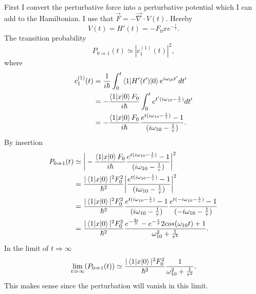 \begin{example}
\begin{enumerate}
		First I convert the perturbative force into a perturbative potential which I can add to the Hamiltonian. I use that $\vec{F}=-\vec{\nabla}\cdot V(t)$. Hereby
		\begin{equation}
			V(t)=H'(t)=-F_0xe^{-\frac{t}{\tau}}.
		\end{equation} 
		The transition probability
		\begin{equation}
			P_{0\Rightarrow 1}(t)\simeq|c_1^{(1)}(t)|^2,
		\end{equation} 
		where
		\begin{equation}
			\begin{split}
				c_1^{(1)}(t)&=\frac{1}{i\hbar}\int_{0}^{t}\braket{1|H'(t')|0}e^{i\omega_{10}t'}dt'\\
				&=-\frac{\braket{1|x|0}F_0}{i\hbar}\int_{0}^{t}e^{t'(i\omega_{10}-\frac{1}{\tau})}dt'\\
				&=-\frac{\braket{1|x|0}F_0}{i\hbar}\frac{e^{t(i\omega_{10}-\frac{1}{\tau})}-1}{(i\omega_{10}-\frac{1}{\tau})}.\\
			\end{split}
		\end{equation} 
		By insertion
		\begin{equation}
			\begin{split}
				P_{0\Rightarrow 1}(t)&\simeq\bigg|-\frac{\braket{1|x|0}F_0}{i\hbar}\frac{e^{t(i\omega_{10}-\frac{1}{\tau})}-1}{(i\omega_{10}-\frac{1}{\tau})}\bigg|^2\\
				&=\frac{|\braket{1|x|0}|^2F_0^2}{\hbar^2}\bigg|\frac{e^{t(i\omega_{10}-\frac{1}{\tau})}-1}{(i\omega_{10}-\frac{1}{\tau})}\bigg|^2\\
				&=\frac{|\braket{1|x|0}|^2F_0^2}{\hbar^2}\frac{e^{t(i\omega_{10}-\frac{1}{\tau})}-1}{(i\omega_{10}-\frac{1}{\tau})}\frac{e^{t(-i\omega_{10}-\frac{1}{\tau})}-1}{(-i\omega_{10}-\frac{1}{\tau})}\\
				&=\frac{|\braket{1|x|0}|^2F_0^2}{\hbar^2}\frac{e^{-\frac{2t}{\tau}}-e^{-\frac{t}{\tau}}2cos(\omega_{10}t)+1}{\omega_{10}^2+\frac{1}{\tau^2}}.\\
			\end{split}
		\end{equation} 
		In the limit of $t\Rightarrow \infty$
		\begin{equation}
			\lim\limits_{t\Rightarrow\infty}(P_{0\Rightarrow 1}(t))\simeq\frac{|\braket{1|x|0}|^2F_0^2}{\hbar^2}\frac{1}{\omega_{10}^2+\frac{1}{\tau^2}}.
		\end{equation} 
		This makes sense since the perturbation will vanish in this limit. 
		

\end{enumerate}
\end{example}
